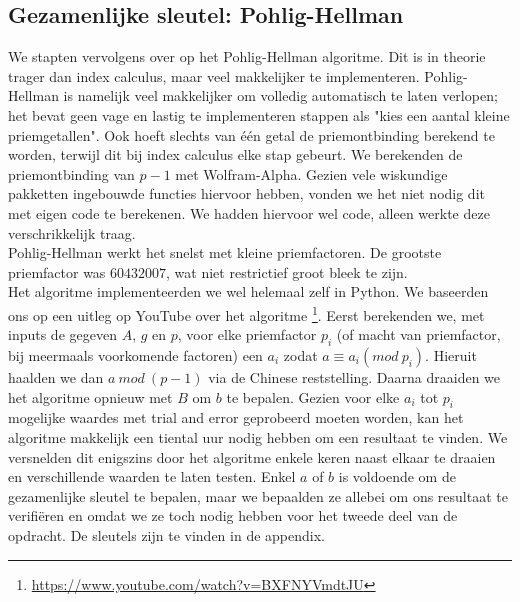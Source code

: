 \subsection{Gezamenlijke sleutel: Pohlig-Hellman}
We stapten vervolgens over op het Pohlig-Hellman algoritme. Dit is in theorie trager dan index calculus, maar veel makkelijker te implementeren. Pohlig-Hellman is namelijk veel makkelijker om volledig automatisch te laten verlopen; het bevat geen vage en lastig te implementeren stappen als "kies een aantal kleine priemgetallen". Ook hoeft slechts van \'e\'en getal de priemontbinding berekend te worden, terwijl dit bij index calculus elke stap gebeurt. We berekenden de priemontbinding van $p-1$ met Wolfram-Alpha. Gezien vele wiskundige pakketten ingebouwde functies hiervoor hebben, vonden we het niet nodig dit met eigen code te berekenen. We hadden hiervoor wel code, alleen werkte deze verschrikkelijk traag.  \\Pohlig-Hellman werkt het snelst met kleine priemfactoren. De grootste priemfactor was $60432007$, wat niet restrictief groot bleek te zijn.  \\ Het algoritme implementeerden we wel helemaal zelf in Python. We baseerden ons op een uitleg op YouTube over het algoritme \footnote{\url{https://www.youtube.com/watch?v=BXFNYVmdtJU}}. Eerst berekenden we, met inputs de gegeven $A$, $g$ en $p$, voor elke priemfactor $p_i$ (of macht van priemfactor, bij meermaals voorkomende factoren) een $a_i$ zodat $a \equiv a_i (mod\ p_i)$. Hieruit haalden we dan $a\ mod \ (p-1)$ via de Chinese reststelling. Daarna draaiden we het algoritme opnieuw met $B$ om $b$ te bepalen. Gezien voor elke $a_i$ tot $p_i$ mogelijke waardes met trial and error geprobeerd moeten worden, kan het algoritme makkelijk een tiental uur nodig hebben om een resultaat te vinden. We versnelden dit enigszins door het algoritme enkele keren naast elkaar te draaien en verschillende waarden te laten testen. Enkel $a$ of $b$ is voldoende om de gezamenlijke sleutel te bepalen, maar we bepaalden ze allebei om ons resultaat te verifi\"eren en omdat we ze toch nodig hebben voor het tweede deel van de opdracht. De sleutels zijn te vinden in de appendix.

